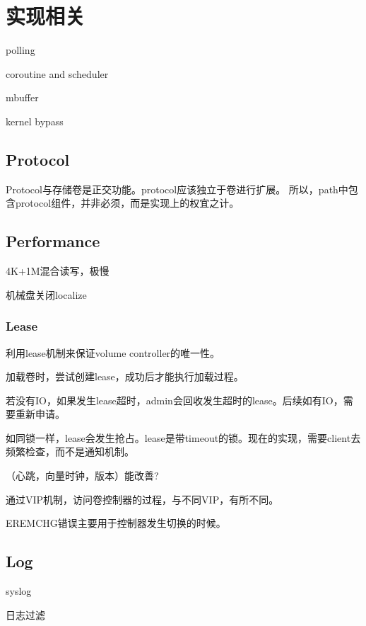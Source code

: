 \chapter{实现相关}

\begin{compactitem}
    \item polling 
    \item coroutine and scheduler
    \item mbuffer
    \item kernel bypass
\end{compactitem}

\section{Protocol}

Protocol与存储卷是正交功能。protocol应该独立于卷进行扩展。
所以，path中包含protocol组件，并非必须，而是实现上的权宜之计。

\section{Performance}

4K+1M混合读写，极慢

机械盘关闭localize

\subsection{Lease}

利用lease机制来保证volume controller的唯一性。

加载卷时，尝试创建lease，成功后才能执行加载过程。

若没有IO，如果发生lease超时，admin会回收发生超时的lease。后续如有IO，需要重新申请。

如同锁一样，lease会发生抢占。lease是带timeout的锁。现在的实现，需要client去频繁检查，而不是通知机制。

（心跳，向量时钟，版本）能改善?

通过VIP机制，访问卷控制器的过程，与不同VIP，有所不同。

EREMCHG错误主要用于控制器发生切换的时候。

\section{Log}

syslog

日志过滤

